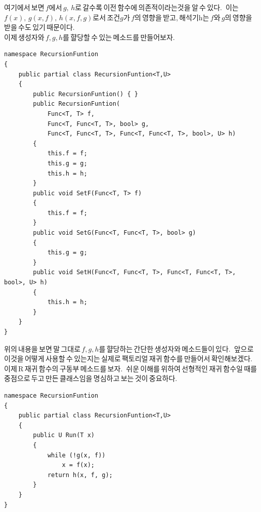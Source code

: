 \documentclass{article}
\begin{document}
여기에서\,보면\,$f$에서\,$g,\,h$로\,갈수록\,이전\,함수에\,의존적이라는것을\,알\,수\,있다.\,
이는\,$f(x),\,g(x,f),\,h(x,f,g)$로서\,조건$g$가\,$f$의\,영향을\,받고,\,해석기h는\,$f$와\,$g$의\,영향을\,받을\,수도\,있기\,때문이다.\\
이제\,생성자와\,$f,g,h$를\,햘당할\,수\,있는\,메소드를\,만들어보자.
\\
\newline
\begin{lstlisting}[caption={재귀\,함수\,R의\,생성자\,및\,햘당\,메소드}]
namespace RecursionFuntion
{
    public partial class RecursionFuntion<T,U>
    {
        public RecursionFuntion() { }
        public RecursionFuntion(
            Func<T, T> f,
            Func<T, Func<T, T>, bool> g,
            Func<T, Func<T, T>, Func<T, Func<T, T>, bool>, U> h)
        {
            this.f = f;
            this.g = g;
            this.h = h;
        }
        public void SetF(Func<T, T> f)
        {
            this.f = f;
        }
        public void SetG(Func<T, Func<T, T>, bool> g)
        {
            this.g = g;
        }
        public void SetH(Func<T, Func<T, T>, Func<T, Func<T, T>, bool>, U> h)
        {
            this.h = h;
        }
    }
}
\end{lstlisting}

위의\,내용을\,보면\,말\,그대로\,$f,g,h$를\,햘당하는\,간단한\,생성자와\,메소드들이\,있다.\,
앞으로\,이것을\,어떻게\,사용할\,수\,있는지는\,실제로\,팩토리얼\,재귀\,함수를\,만들어서\,확인해보겠다.\,
이제\,R\,재귀\,함수의\,구동부\,메소드를\,보자.\,
쉬운\,이해를\,위하여\,선형적인\,재귀\,함수일\,때를\,중점으로\,두고\,만든\,클래스임을\,명심하고\,보는\,것이\,중요하다.
\\
\newline
\begin{lstlisting}[caption={재귀\,함수\,R의\,구동\,메소드\,Run}]
namespace RecursionFuntion
{
    public partial class RecursionFuntion<T,U>
    {
        public U Run(T x)
        {
            while (!g(x, f))
                x = f(x);
            return h(x, f, g);
        }
    }
}
\end{lstlisting}
\end{document}
